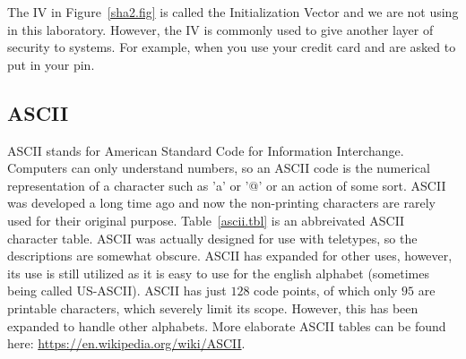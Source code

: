 \documentclass{article}
\begin{document}
The IV in Figure~\ref{sha2.fig} is called the Initialization Vector
and we are not using in this laboratory.  However, the IV is commonly
used to give another layer of security to systems.  For example, when
you use your credit card and are asked to put in your pin.

\subsection{ASCII}

ASCII stands for American Standard Code for Information
Interchange. Computers can only understand numbers, so an ASCII code
is the numerical representation of a character such as 'a' or '@' or
an action of some sort. ASCII was developed a long time ago and now
the non-printing characters are rarely used for their original
purpose. Table~\ref{ascii.tbl} is an abbreivated
ASCII character table. ASCII was
actually designed for use with teletypes, so the descriptions are
somewhat obscure.
ASCII has expanded for other uses, however, its use is still
utilized as it is easy to use for the english alphabet (sometimes being
called US-ASCII).
ASCII has just $128$ code points, of which only $95$ are printable
characters, which severely limit its scope.  However, this has been
expanded to handle other alphabets.  More elaborate ASCII tables can
be found here: \url{https://en.wikipedia.org/wiki/ASCII}.
\end{document}
